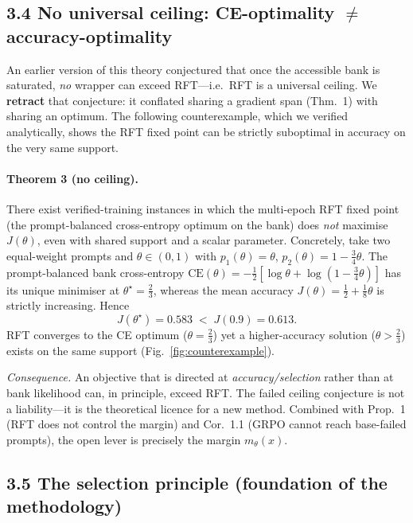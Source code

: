 \subsection*{3.4 No universal ceiling: CE-optimality $\neq$ accuracy-optimality}

An earlier version of this theory conjectured that once the accessible bank is
saturated, \emph{no} wrapper can exceed RFT---i.e.\ RFT is a universal ceiling. We
\textbf{retract} that conjecture: it conflated sharing a gradient span
(Thm.~1) with sharing an optimum. The following counterexample, which we verified
analytically, shows the RFT fixed point can be strictly suboptimal in accuracy on
the very same support.

\paragraph{Theorem 3 (no ceiling).}
There exist verified-training instances in which the multi-epoch RFT fixed point
(the prompt-balanced cross-entropy optimum on the bank) does \emph{not} maximise
$J(\theta)$, even with shared support and a scalar parameter. Concretely, take two
equal-weight prompts and $\theta\in(0,1)$ with $p_1(\theta)=\theta$,
$p_2(\theta)=1-\tfrac34\theta$. The prompt-balanced bank cross-entropy
$\mathrm{CE}(\theta)=-\tfrac12[\log\theta+\log(1-\tfrac34\theta)]$ has its unique
minimiser at $\theta^{\star}=\tfrac23$, whereas the mean accuracy
$J(\theta)=\tfrac12+\tfrac18\theta$ is strictly increasing. Hence
\[
J(\theta^{\star})=0.583 \;<\; J(0.9)=0.613 .
\]
RFT converges to the CE optimum ($\theta=\tfrac23$) yet a higher-accuracy solution
($\theta>\tfrac23$) exists on the same support (Fig.~\ref{fig:counterexample}).

\emph{Consequence.} An objective that is directed at \emph{accuracy/selection}
rather than at bank likelihood can, in principle, exceed RFT. The failed
ceiling conjecture is not a liability---it is the theoretical licence for a new
method. Combined with Prop.~1 (RFT does not control the margin) and Cor.~1.1
(GRPO cannot reach base-failed prompts), the open lever is precisely the margin
$m_\theta(x)$.

\subsection*{3.5 The selection principle (foundation of the methodology)}

